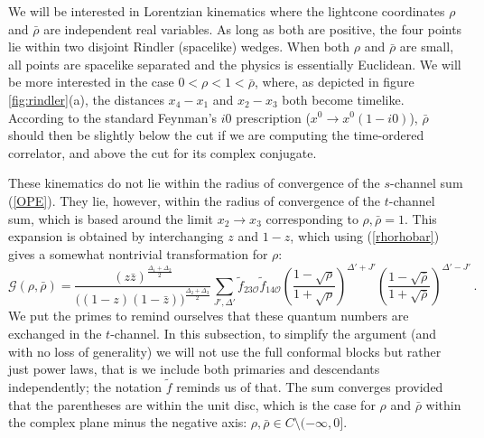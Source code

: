 \documentclass[11pt, reqno,preprint]{article}
\def\be{\begin{equation}}
\def\ee{\end{equation}}
\def\OO{\mathcal{O}}
\def\rhobar{\bar{\rho}}
\def\zbar{\bar{z}}
\def\j{J}
\def\GG{\mathcal{G}}
\begin{document}
We will be interested in Lorentzian kinematics where the lightcone coordinates $\rho$ and $\rhobar$ are independent
real variables.  As long as both are positive, the four points lie within two disjoint Rindler (spacelike) wedges.
When both $\rho$ and $\rhobar$ are small, all points are spacelike separated and the physics is essentially Euclidean.
We will be more interested in the case $0<\rho<1<\rhobar$, where, as depicted in figure \ref{fig:rindler}(a), the distances $x_4-x_1$ and $x_2-x_3$ both become timelike.
According to the standard Feynman's $i0$ prescription ($x^0\to x^0(1-i0)$),
$\rhobar$ should then be slightly below the cut if we are computing the time-ordered correlator, and above the cut for its complex conjugate.

These kinematics do not lie within the radius of convergence of the $s$-channel sum (\ref{OPE}).
They lie, however, within the radius of convergence of the $t$-channel sum, which is based around the limit $x_2{\to}x_3$
corresponding to $\rho,\rhobar=1$.
This expansion is obtained by interchanging $z$ and $1-z$, which using (\ref{rhorhobar})
gives a somewhat nontrivial transformation for $\rho$:
\be
 \GG(\rho,\rhobar) = \frac{(z\zbar)^{\frac{\Delta_1+\Delta_2}{2}}}{\big((1{-}z)(1{-}\zbar)\big)^{\frac{\Delta_2+\Delta_3}{2}}}
 \sum_{\j',\Delta'}
\tilde f_{23\OO}\tilde f_{14\OO}
 \left(\frac{1-\sqrt{\rho}}{1+\sqrt{\rho}}\right)^{\Delta'+\j'}
 \left(\frac{1-\sqrt{\rhobar}}{1+\sqrt{\rhobar}}\right)^{\Delta'-\j'}\,. \label{t-channel_OPE}
\ee
We put the primes to remind ourselves that these quantum numbers are exchanged in the $t$-channel.
In this subsection, to simplify the argument (and with no loss of generality) we will not use the full conformal blocks but rather just
power laws, that is we include both primaries and descendants independently;
the notation $\tilde{f}$ reminds us of that.
The sum converges provided that the parentheses are within the unit disc, which is the case for $\rho$ and $\rhobar$ within
the complex plane minus the negative axis: $\rho,\rhobar\in C\setminus (-\infty,0]$.
\end{document}
